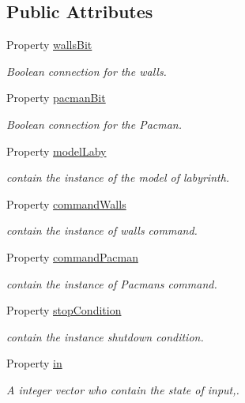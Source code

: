 \subsection*{Public Attributes}
\begin{DoxyCompactItemize}
\item 
Property \hyperlink{class_wrapper_a94dd71be012b98d496117309a20939b1}{walls\+Bit}
\begin{DoxyCompactList}\small\item\em Boolean connection for the walls. \end{DoxyCompactList}\item 
Property \hyperlink{class_wrapper_abf190bfcb1e7ec7573c4e002d30cb125}{pacman\+Bit}
\begin{DoxyCompactList}\small\item\em Boolean connection for the Pacman. \end{DoxyCompactList}\item 
Property \hyperlink{class_wrapper_a65b2390d6d3e36b42ee0ea886a562d5c}{model\+Laby}
\begin{DoxyCompactList}\small\item\em contain the instance of the model of labyrinth. \end{DoxyCompactList}\item 
Property \hyperlink{class_wrapper_ae0183c9714a832124ccb420d5f9d3c1f}{command\+Walls}
\begin{DoxyCompactList}\small\item\em contain the instance of wall\textquotesingle{}s command. \end{DoxyCompactList}\item 
Property \hyperlink{class_wrapper_ab39f6156efa48a09b1d92e22eb9fc94a}{command\+Pacman}
\begin{DoxyCompactList}\small\item\em contain the instance of Pacman\textquotesingle{}s command. \end{DoxyCompactList}\item 
Property \hyperlink{class_wrapper_a19a246dc459b20945f02106d6734fa4b}{stop\+Condition}
\begin{DoxyCompactList}\small\item\em contain the instance shutdown condition. \end{DoxyCompactList}\item 
Property \hyperlink{class_wrapper_a5e252d97ca5bf85c5753e2914673eead}{in}
\begin{DoxyCompactList}\small\item\em A integer vector who contain the state of input,. \end{DoxyCompactList}\item 

\end{DoxyCompactItemize}
